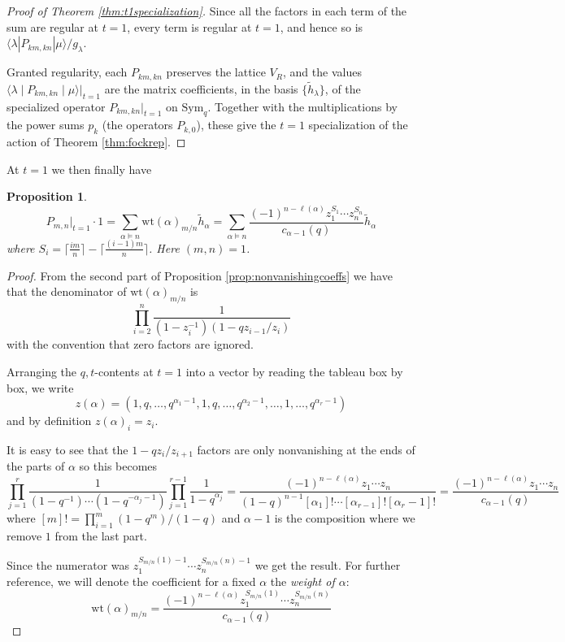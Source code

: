 \documentclass{amsart}
\numberwithin{equation}{section}
\newtheorem{proposition}[lemma]{Proposition}%
\theoremstyle{definition}
\def\tilde{\widetilde}
\def\Sym{{\mathrm{Sym}}}
\renewcommand{\th}{\tilde{h}}
\newcommand{\wt}{\mathrm{wt}}
\begin{document}
\begin{proof}[Proof of Theorem \ref{thm:t1specialization}]
Since all the factors in each term of the sum are regular at $t=1$, every term is regular at $t=1$, and hence so is $\langle\lambda|P_{km,kn}|\mu\rangle/g_\lambda$.

Granted regularity, each $P_{km,kn}$ preserves the lattice $V_R$, and the values $\langle \lambda \mid P_{km,kn} \mid \mu \rangle\big|_{t=1}$ are the matrix coefficients, in the basis $\{\th_\lambda\}$, of the specialized operator $P_{km,kn}|_{t=1}$ on $\Sym_q$. Together with the multiplications by the power sums $p_k$ (the operators $P_{k,0}$), these give the $t=1$ specialization of the action of Theorem \ref{thm:fockrep}.
\end{proof}


At $t=1$ we then finally have 
\begin{proposition}
\label{prop:limitformula}
\begin{equation}
\label{eq:Pmnattequals1}
P_{m,n}|_{t=1}\cdot 1=\sum_{\alpha\vDash n} \wt(\alpha)_{m/n} \th_\alpha =\sum_{\alpha\vDash n}\frac{(-1)^{n-\ell(\alpha)}z_1^{S_1}\cdots z_n^{S_n} }{c_{\alpha-1}(q)} \th_\alpha
\end{equation}
where $S_i=\lceil \frac{im}{n}\rceil -\lceil \frac{(i-1)m}{n}\rceil$. Here $(m,n)=1$.
\end{proposition}
\begin{proof}
From the second part of Proposition \ref{prop:nonvanishingcoeffs} we have that the denominator of $\wt(\alpha)_{m/n}$ is
$$
\prod_{i=2}^{n}\frac{1}{(1-z_i^{-1})(1-qz_{i-1}/z_{i})}
$$
with the convention that zero factors are ignored.

Arranging the $q,t$-contents at $t=1$ into a vector by reading the tableau box by box, we write
$$
z(\alpha)=(1,q,\ldots,q^{\alpha_1-1},1,q,\ldots,q^{\alpha_2-1},\ldots,1,\ldots,q^{\alpha_r-1})
$$ 
and by definition $z(\alpha)_i=z_i$.

It is easy to see that the $1-qz_i/z_{i+1}$ factors are only nonvanishing at the ends of the parts of $\alpha$ so this becomes
$$
\prod_{j=1}^{r}\frac{1}{(1-q^{-1})\cdots (1-q^{-\alpha_j-1})}\prod_{j=1}^{r-1}\frac{1}{1-q^{\alpha_j}}=\frac{(-1)^{n-\ell(\alpha)}z_1\cdots z_n }{(1-q)^{n-1}[\alpha_1]!\cdots [\alpha_{r-1}]![\alpha_{r}-1]!}=\frac{(-1)^{n-\ell(\alpha)}z_1\cdots z_n}{c_{\alpha-1}(q)}
$$
where $[m]!=\prod_{i=1}^{m}(1-q^m)/(1-q)$ and $\alpha-1$ is the composition where we remove $1$ from the last part. 

Since the numerator was $z_1^{S_{m/n}(1)-1}\cdots z_n^{S_{m/n}(n)-1}$ we get the result.
For further reference, we will denote the coefficient for a fixed $\alpha$ the {\em weight of $\alpha$}:
\begin{equation}
    \label{eq:compweightcoprime}
    \wt(\alpha)_{m/n}=\frac{(-1)^{n-\ell(\alpha)}z_1^{S_{m/n}(1)}\cdots z_n^{S_{m/n}(n)}}{c_{\alpha-1}(q)}
\end{equation}
\end{proof}
\end{document}
